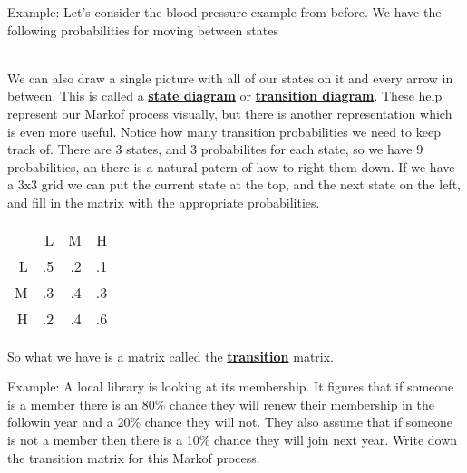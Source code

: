 \documentclass[14,fleqn]{article}
\newcommand{\defn}[1]{\textbf{\underline{#1}}}
\begin{document}
Example: Let's consider the blood pressure example from before. We have the following probabilities for moving between states\\
\\
We can also draw a single picture with all of our states on it and every arrow in between. This is called a \defn{state diagram} or \defn{transition diagram}. These help represent our Markof process visually, but there is another representation which is even more useful. Notice how many transition probabilities we need to keep track of. There are 3 states, and 3 probabilites for each state, so we have 9 probabilities, an there is a natural patern of how to right them down. If we have a 3x3 grid we can put the current state at the top, and the next state on the left, and fill in the matrix with the appropriate probabilities.

\begin{tabular}{rrrr}
	&L&M&H\\
	L&.5&.2&.1\\
	M&.3&.4&.3\\
	H&.2&.4&.6\\
\end{tabular}
So what we have is a matrix called the \defn{transition} matrix.

Example: A local library is looking at its membership. It figures that if someone is a member there is an 80\% chance they will renew their membership in the followin year and a 20\% chance they will not. They also assume that if someone is not a member then there is a 10\% chance they will join next year. Write down the transition matrix for this Markof process.\\
\end{document}
